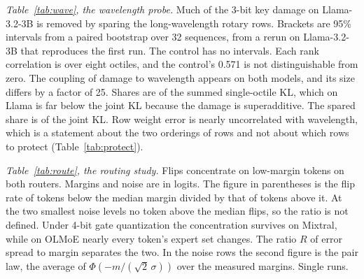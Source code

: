 \documentclass[journal,onecolumn]{IEEEtran}
\begin{document}
\emph{Table~\ref{tab:wave}, the wavelength probe.} Much of the 3-bit key damage on Llama-3.2-3B is removed by sparing the long-wavelength rotary rows. Brackets are 95\% intervals from a paired bootstrap over 32 sequences, from a rerun on Llama-3.2-3B that reproduces the first run. The control has no intervals. Each rank correlation is over eight octiles, and the control's 0.571 is not distinguishable from zero. The coupling of damage to wavelength appears on both models, and its size differs by a factor of 25. Shares are of the summed single-octile KL, which on Llama is far below the joint KL because the damage is superadditive. The spared share is of the joint KL. Row weight error is nearly uncorrelated with wavelength, which is a statement about the two orderings of rows and not about which rows to protect (Table~\ref{tab:protect}).

\emph{Table~\ref{tab:route}, the routing study.} Flips concentrate on low-margin tokens on both routers. Margins and noise are in logits. The figure in parentheses is the flip rate of tokens below the median margin divided by that of tokens above it. At the two smallest noise levels no token above the median flips, so the ratio is not defined. Under 4-bit gate quantization the concentration survives on Mixtral, while on OLMoE nearly every token's expert set changes. The ratio $R$ of error spread to margin separates the two. In the noise rows the second figure is the pair law, the average of $\Phi(-m/(\sqrt2\,\sigma))$ over the measured margins. Single runs.



\end{document}
